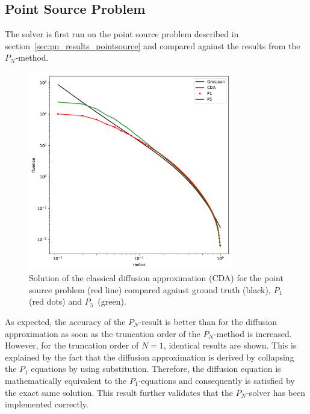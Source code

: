 \subsection{Point Source Problem}
\label{sec:da_results_pointsource}
The solver is first run on the point source problem described in section~\ref{sec:pn_results_pointsource} and compared against the results from the $P_N$-method.
\begin{figure}[h]
\centering
\includegraphics[width=0.8\textwidth]{05_diffusion_approximation/results/cda_result_plot_pointsource.pdf}
\caption{Solution of the classical diffusion approximation (CDA) for the point source problem (red line) compared against ground truth (black), $P_1$ (red dots) and $P_5$~(green).}
\label{fig:da_results_pointsource_1}
\end{figure}

As expected, the accuracy of the $P_N$-result is better than for the diffusion approximation as soon as the truncation order of the $P_N$-method is increased. However, for the truncation order of $N=1$, identical results are shown. This is explained by the fact that the diffusion approximation is derived by collapsing the $P_1$ equations by using substitution. Therefore, the diffusion equation is mathematically equivalent to the $P_1$-equations and consequently is satisfied by the exact same solution. This result further validates that the $P_N$-solver has been implemented correctly.


